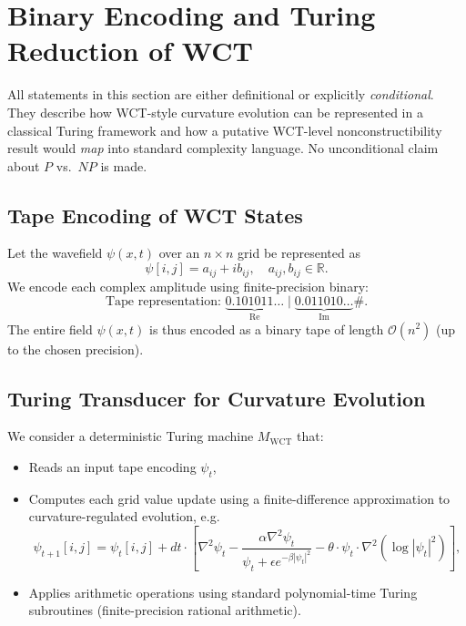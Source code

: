 \documentclass[12pt]{article}
\theoremstyle{remark}
\begin{document}
\clearpage
\section{Binary Encoding and Turing Reduction of WCT}

All statements in this section are either definitional or explicitly \emph{conditional}.
They describe how WCT-style curvature evolution can be represented in a classical
Turing framework and how a putative WCT-level nonconstructibility result would
\emph{map} into standard complexity language.
No unconditional claim about $P$ vs.\ $NP$ is made.

\subsection{Tape Encoding of WCT States}

Let the wavefield \( \psi(x,t) \) over an \( n \times n \) grid be represented as
\[
\psi[i,j] = a_{ij} + i b_{ij}, \quad a_{ij}, b_{ij} \in \mathbb{R}.
\]
We encode each complex amplitude using finite-precision binary:
\[
\text{Tape representation: } \underbrace{0.101011\ldots}_{\text{Re}} \mid \underbrace{0.011010\ldots}_{\text{Im}} \#.
\]
The entire field \( \psi(x,t) \) is thus encoded as a binary tape of length
\( \mathcal{O}(n^2) \) (up to the chosen precision).

\subsection{Turing Transducer for Curvature Evolution}

We consider a deterministic Turing machine \( M_{\text{WCT}} \) that:

\begin{itemize}
  \item Reads an input tape encoding \( \psi_t \),
  \item Computes each grid value update using a finite-difference approximation to curvature-regulated evolution, e.g.
  \[
    \psi_{t+1}[i,j] = \psi_t[i,j] + dt \cdot \left[ \nabla^2 \psi_t
      - \frac{\alpha \nabla^2 \psi_t}{\psi_t + \epsilon e^{-\beta |\psi_t|^2}}
      - \theta \cdot \psi_t \cdot \nabla^2(\log |\psi_t|^2) \right],
  \]
  \item Applies arithmetic operations using standard polynomial-time Turing subroutines (finite-precision rational arithmetic).
\end{itemize}
\end{document}
